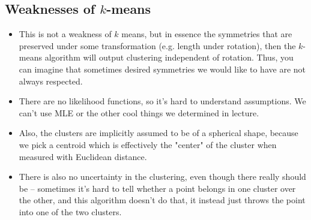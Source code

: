 \subsection{Weaknesses of \( k \)-means}
\begin{itemize}
	\item This is not a weakness of \( k \) means, but in essence the symmetries that are preserved under
		some transformation (e.g. length under rotation), then the \( k \)-means algorithm will output
		clustering independent of rotation. Thus, you can imagine that sometimes desired symmetries we would
		like to have are not always respected. 
	\item There are no likelihood functions, so it's hard to understand assumptions. We can't use MLE or the
		other cool things we determined in lecture. 
	\item Also, the clusters are implicitly assumed to be of a spherical shape, because we pick a centroid
		which is effectively the "center" of the cluster when measured with Euclidean distance. 
	\item There is also no uncertainty in the clustering, even though there really should be -- sometimes
		it's hard to tell whether a point belongs in one cluster over the other, and this algorithm doesn't
		do that, it instead just throws the point into one of the two clusters.   
\end{itemize}

